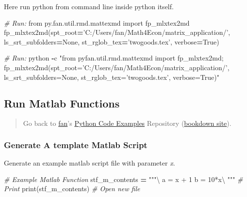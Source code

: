 \documentclass[
]{book}
\newenvironment{Shaded}{\begin{snugshade}}{\end{snugshade}}
\newcommand{\BuiltInTok}[1]{#1}
\newcommand{\CommentTok}[1]{\textcolor[rgb]{0.56,0.35,0.01}{\textit{#1}}}
\newcommand{\ImportTok}[1]{#1}
\newcommand{\NormalTok}[1]{#1}
\newcommand{\OperatorTok}[1]{\textcolor[rgb]{0.81,0.36,0.00}{\textbf{#1}}}
\newcommand{\StringTok}[1]{\textcolor[rgb]{0.31,0.60,0.02}{#1}}
\newcommand{\VariableTok}[1]{\textcolor[rgb]{0.00,0.00,0.00}{#1}}
\begin{document}
Here run python from command line inside python itself.

\begin{Shaded}
\begin{Highlighting}[]
\CommentTok{# Run:}
\ImportTok{from}\NormalTok{ py.fan.util.rmd.mattexmd }\ImportTok{import}\NormalTok{ fp_mlxtex2md}
\NormalTok{fp_mlxtex2md(spt_root}\OperatorTok{=}\StringTok{'C:/Users/fan/Math4Econ/matrix_application/'}\NormalTok{, ls_srt_subfolders}\OperatorTok{=}\VariableTok{None}\NormalTok{, st_rglob_tex}\OperatorTok{=}\StringTok{'twogoods.tex'}\NormalTok{, verbose}\OperatorTok{=}\VariableTok{True}\NormalTok{)}
\end{Highlighting}
\end{Shaded}

\begin{Shaded}
\begin{Highlighting}[]
\CommentTok{# Run:}
\NormalTok{python }\OperatorTok{-}\NormalTok{c }\StringTok{"from pyfan.util.rmd.mattexmd import fp_mlxtex2md; fp_mlxtex2md(spt_root='C:/Users/fan/Math4Econ/matrix_application/', ls_srt_subfolders=None, st_rglob_tex='twogoods.tex', verbose=True)"}
\end{Highlighting}
\end{Shaded}

\hypertarget{run-matlab-functions}{%
\subsection{Run Matlab Functions}\label{run-matlab-functions}}

\begin{quote}
Go back to \href{http://fanwangecon.github.io/}{fan}'s \href{https://fanwangecon.github.io/pyfan/}{Python Code Examples} Repository (\href{https://fanwangecon.github.io/pyfan/bookdown}{bookdown site}).
\end{quote}

\hypertarget{generate-a-template-matlab-script}{%
\subsubsection{Generate A template Matlab Script}\label{generate-a-template-matlab-script}}

Generate an example matlab script file with parameter \emph{x}.

\begin{Shaded}
\begin{Highlighting}[]
\CommentTok{# Example Matlab Function}
\NormalTok{stf_m_contents }\OperatorTok{=} \StringTok{"""\textbackslash{}}
\StringTok{a = x + 1}
\StringTok{b = 10*x\textbackslash{}}
\StringTok{"""}
\CommentTok{# Print}
\BuiltInTok{print}\NormalTok{(stf_m_contents)}
\CommentTok{# Open new file}
\end{Highlighting}
\end{Shaded}
\end{document}
